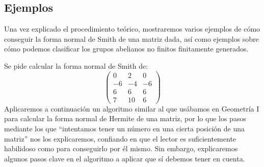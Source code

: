 \subsection{Ejemplos}
\noindent
Una vez explicado el procedimiento teórico, mostraremos varios ejemplos de cómo conseguir la forma normal de Smith de una matriz dada, así como ejemplos sobre cómo podemos clasificar los grupos abelianos no finitos finitamente generados.

\begin{ejemplo}
    Se pide calcular la forma normal de Smith de:
    \begin{equation*}
        \left(\begin{array}{cccc}
            0 & 2 & 0 \\
            -6 & -4 & -6 \\
            6 & 6 & 6 \\
            7 & 10 & 6  
        \end{array}\right)
    \end{equation*}
    Aplicaremos a continuación un algoritmo similar al que usábamos en Geometría I para calcular la forma normal de Hermite de una matriz, por lo que los pasos mediante los que ``intentamos tener un número en una cierta posición de una matriz'' nos los explicaremos, confiando en que el lector es suficientemente habilidoso como para conseguirlo por él mismo. Sin embargo, explicaremos algunos pasos clave en el algoritmo a aplicar que sí debemos tener en cuenta.\\


\end{ejemplo}
